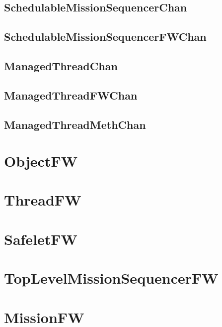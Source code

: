 \documentclass{article}
\begin{document}
\begin{plumbing}
\subsection{SchedulableMissionSequencerChan}


\subsection{SchedulableMissionSequencerFWChan}


\subsection{ManagedThreadChan}


\subsection{ManagedThreadFWChan}


\subsection{ManagedThreadMethChan}

\newpage
\end{plumbing}

\section{ObjectFW}

\newpage

\section{ThreadFW}

\newpage

\section{SafeletFW}

\newpage

\section{TopLevelMissionSequencerFW}

\newpage

\section{MissionFW}

\newpage
\end{document}
